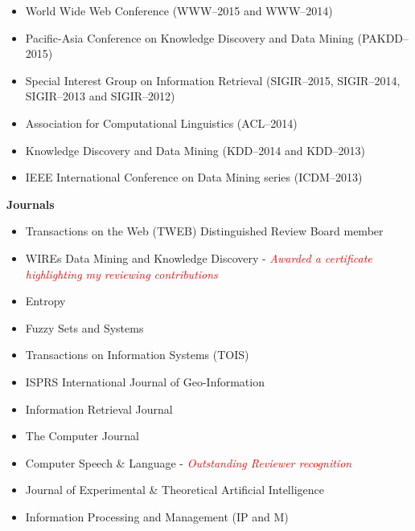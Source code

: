 \documentclass[margin]{res}
\begin{document}
\begin{resume}
\begin{itemize}
\begin{itemize}
\item World Wide Web Conference (WWW--2015 and WWW--2014)\\
\item Pacific-Asia Conference on Knowledge Discovery and Data Mining (PAKDD--2015)\\
\item Special Interest Group on Information Retrieval (SIGIR--2015, SIGIR--2014, SIGIR--2013 and SIGIR--2012)\\
\item Association for Computational Linguistics (ACL--2014)\\
\item Knowledge Discovery and Data Mining (KDD--2014 and KDD--2013)\\
\item IEEE International Conference on Data Mining series (ICDM--2013)
\end{itemize}
\end{itemize}
\textbf{Journals}
\begin{itemize} \itemsep -10pt
\item Transactions on the Web (TWEB) Distinguished Review Board member \\
\item WIREs Data Mining and Knowledge Discovery - \textcolor{red}{\textit{Awarded a certificate highlighting my reviewing contributions}} \\
\item Entropy \\
\item Fuzzy Sets and Systems \\
\item Transactions on Information Systems (TOIS) \\
\item ISPRS International Journal of Geo-Information \\
\item Information Retrieval Journal \\
\item The Computer Journal \\
\item Computer Speech \& Language - \textcolor{red}{\textit{Outstanding Reviewer recognition}}\\
\item Journal of Experimental \& Theoretical Artificial Intelligence\\
\item Information Processing and Management (IP and M)\\

\end{itemize}
\end{resume}
\end{document}
